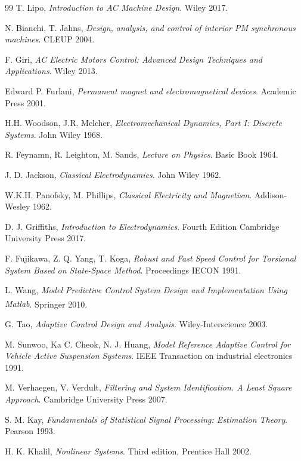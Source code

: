 \documentclass[12pt,a4paper,oneside]{book}
\begin{document}
\begin{thebibliography}{99}
	T. Lipo,  \emph{Introduction to AC Machine Design}. Wiley 2017.
	
	N. Bianchi, T. Jahns,  \emph{Design, analysis, and control of interior PM synchronous machines}. CLEUP 2004.
	
	F. Giri, \emph{AC Electric Motors Control: Advanced Design Techniques and Applications}. Wiley 2013.

	Edward P. Furlani, \emph{Permanent magnet and electromagnetical devices}. Academic Press 
	2001.

	H.H. Woodson, J.R. Melcher, \emph{Electromechanical Dynamics, Part I: Discrete Systems}. John Wiley 1968.

	R. Feynamn, R. Leighton, M. Sands, \emph{Lecture on Physics}. Basic Book 1964.

	J. D. Jackson, \emph{Classical Electrodynamics}. John Wiley 1962.

	W.K.H. Panofsky, M. Phillips, \emph{Classical Electricity and Magnetism}. Addison-Wesley 1962.

	D. J. Griffiths, \emph{Introduction to Electrodynamics}. Fourth Edition Cambridge University Press 2017.

	F. Fujikawa, Z. Q. Yang, T. Koga, \emph{Robust and Fast Speed Control for Torsional System Based on State-Space Method}. Proceedings IECON 1991.

	L. Wang, \emph{Model Predictive Control System Design and Implementation Using 	Matlab\textsuperscript{\textregistered}}. Springer 2010.

	G. Tao, \emph{Adaptive Control Design and Analysis}. Wiley-Interscience 2003.
	
	M. Sunwoo, Ka C. Cheok, N. J. Huang,  \emph{Model Reference Adaptive Control for Vehicle Active Suspension Systems}. IEEE Transaction on industrial electronics 1991.
	
	M. Verhaegen, V. Verdult,  \emph{Filtering and System Identification. A Least Square Approach}. Cambridge University Press 2007.
	
	S. M. Kay,  \emph{Fundamentals of Statistical Signal Processing: Estimation Theory}. Pearson 1993.

	H. K. Khalil,  \emph{Nonlinear Systems}. Third edition, Prentice Hall 2002.
	

\end{thebibliography}
\end{document}
